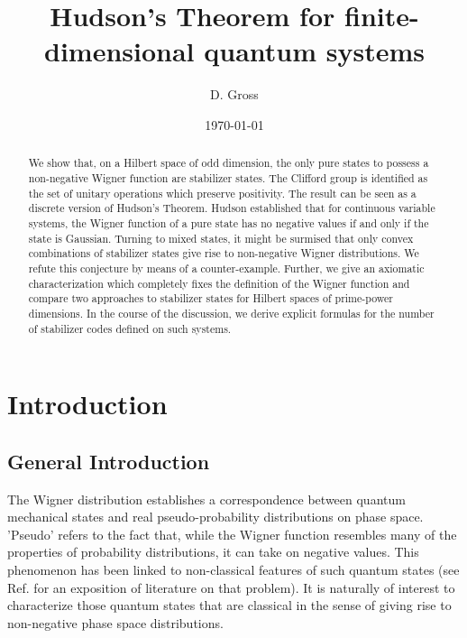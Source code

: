 \documentclass[aps,twocolumn,floatfix]{revtex4}
\begin{document}
\title{Hudson's Theorem for finite-dimensional quantum systems}

\author{D. Gross}



\date{\today}

\begin{abstract} 
We show that, on a Hilbert space of odd dimension, the only pure
states to possess a non-negative Wigner function are stabilizer
states. The Clifford group is identified as the set of unitary
operations which preserve positivity.  The result can be seen as a
discrete version of Hudson's Theorem.  Hudson established that for
continuous variable systems, the Wigner function of a pure state has
no negative values if and only if the state is Gaussian.  Turning to
mixed states, it might be surmised that only convex combinations of
stabilizer states give rise to non-negative Wigner distributions. We
refute this conjecture by means of a counter-example. Further, we give
an axiomatic characterization which completely fixes the definition of
the Wigner function and compare two approaches to stabilizer states
for Hilbert spaces of prime-power dimensions. In the course of the
discussion, we derive explicit formulas for the number of stabilizer
codes defined on such systems.
\end{abstract}


\maketitle

\section{Introduction}

\subsection{General Introduction}

The Wigner distribution establishes a correspondence between quantum
mechanical states and real pseudo-probability distributions on phase
space. 'Pseudo' refers to the fact that, while the Wigner function
resembles many of the properties of probability distributions, it can
take on negative values. This phenomenon has been linked to
non-classical features of such quantum states (see Ref. \cite{zyko}
for an exposition of literature on that problem). It is naturally of
interest to characterize those quantum states that are classical in
the sense of giving rise to non-negative phase space distributions.
\end{document}
